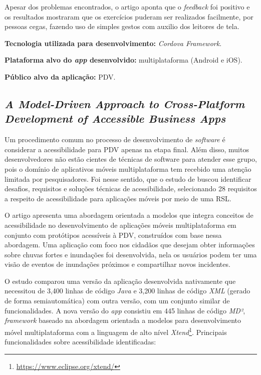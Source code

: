 Apesar dos problemas encontrados, o artigo aponta que o \emph{feedback} foi positivo e os resultados mostraram que os exercícios puderam ser realizados facilmente, por pessoas cegas,
fazendo uso de simples gestos com auxilio dos leitores de tela.

\textbf{Tecnologia utilizada para desenvolvimento:} \emph{Cordova Framework}.

\textbf{Plataforma alvo do \emph{app} desenvolvido:} multiplataforma (Android e iOS).

\textbf{Público alvo da aplicação:} PDV\@.

\subsection{\emph{A Model-Driven Approach to Cross-Platform Development of Accessible Business Apps}}

Um procedimento comum no processo de desenvolvimento de \emph{software} é considerar a acessibilidade para PDV apenas na etapa final.
Além disso, muitos desenvolvedores não estão cientes de técnicas de software para atender esse grupo, pois o domínio de aplicativos
móveis multiplataforma tem recebido uma atenção limitada por pesquisadores. Foi nesse sentido, que o estudo de 
buscou identificar desafios, requisitos e soluções técnicas de acessibilidade, selecionando 28 requisitos a respeito de acessibilidade para
aplicações móveis por meio de uma RSL\@.

O artigo apresenta uma abordagem orientada a modelos que integra conceitos de acessibilidade no desenvolvimento de aplicações móveis multiplataforma em conjunto com protótipos
acessíveis à PDV, construídos com base nessa abordagem. Uma aplicação com foco nos cidadãos que desejam obter informações sobre chuvas fortes e inundações foi desenvolvida, nela
os usuários podem ter uma visão de eventos de inundações próximos e compartilhar novos incidentes.

O estudo comparou uma versão da aplicação desenvolvida nativamente que necessitou de 3,400 linhas de código \emph{Java} e 3,200 linhas de código \emph{XML}
(gerado de forma semiautomática) com outra versão, com um conjunto similar de funcionalidades. A nova versão do \emph{app} consistiu em 445 linhas de código \emph{MD²}, \emph{framework}
baseado na abordagem orientada a modelos para desenvolvimento móvel multiplataforma com a linguagem de alto nível \emph{Xtend}\footnote{\url{https://www.eclipse.org/xtend/}}.
Principais funcionalidades sobre acessibilidade identificadas:

